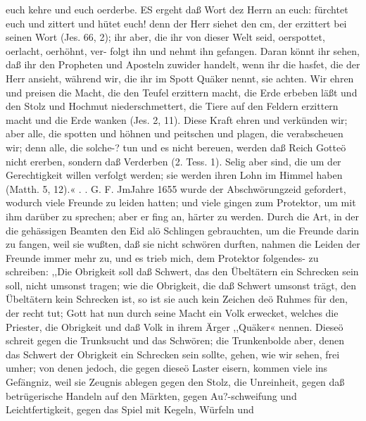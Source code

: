 {%
euch kehre und euch oerderbe. ES ergeht daß Wort dez Herrn
an euch: fürchtet euch und zittert und hütet euch! denn der Herr
siehet den cm, der erzittert bei seinen Wort (Jes. 66, 2); ihr aber,
die ihr von dieser Welt seid, oerspottet, oerlacht, oerhöhnt, ver-
folgt ihn und nehmt ihn gefangen. Daran könnt ihr sehen, daß
ihr den Propheten und Aposteln zuwider handelt, wenn ihr die hasfet,
die der Herr ansieht, während wir, die ihr im Spott Quäker
nennt, sie achten. Wir ehren und preisen die Macht, die den
Teufel erzittern macht, die Erde erbeben läßt und den Stolz und
Hochmut niederschmettert, die Tiere auf den Feldern erzittern
macht und die Erde wanken (Jes. 2, 11). Diese Kraft ehren
und verkünden wir; aber alle, die spotten und höhnen und
peitschen und plagen, die verabscheuen wir; denn alle, die solche-?
tun und es nicht bereuen, werden daß Reich Gotteö nicht ererben,
sondern daß Verderben (2. Tess. 1).
Selig aber sind, die um der Gerechtigkeit willen verfolgt
werden; sie werden ihren Lohn im Himmel haben (Matth. 5, 12).« . .
G. F.
JmJahre 1655 wurde der Abschwörungzeid gefordert, wodurch
viele Freunde zu leiden hatten; und viele gingen zum Protektor, um
mit ihm darüber zu sprechen; aber er fing an, härter zu werden.
Durch die Art, in der die gehässigen Beamten den Eid alö
Schlingen gebrauchten, um die Freunde darin zu fangen, weil sie
wußten, daß sie nicht schwören durften, nahmen die Leiden der
Freunde immer mehr zu, und es trieb mich, dem Protektor folgendes-
zu schreiben:
,,Die Obrigkeit soll daß Schwert, das den Übeltätern ein
Schrecken sein soll, nicht umsonst tragen; wie die Obrigkeit, die
daß Schwert umsonst trägt, den Übeltätern kein Schrecken ist, so
ist sie auch kein Zeichen deö Ruhmes für den, der recht tut;
Gott hat nun durch seine Macht ein Volk erwecket, welches
die Priester, die Obrigkeit und daß Volk in ihrem Ärger ,,Quäker«
nennen. Dieseö schreit gegen die Trunksucht und das Schwören;
die Trunkenbolde aber, denen das Schwert der Obrigkeit ein
Schrecken sein sollte, gehen, wie wir sehen, frei umher; von denen
jedoch, die gegen dieseö Laster eisern, kommen viele ins Gefängniz,
weil sie Zeugnis ablegen gegen den Stolz, die Unreinheit, gegen
daß betrügerische Handeln auf den Märkten, gegen Au?-schweifung
und Leichtfertigkeit, gegen das Spiel mit Kegeln, Würfeln und


}
